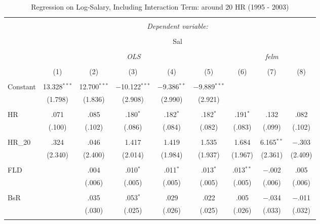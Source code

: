 
\begin{table}[H] \centering
  \caption{Regression on Log-Salary, Including Interaction Term: around 20 HR (1995 - 2003)} 
  \label{HR20_C}
\tiny
\begin{tabular}{@{\extracolsep{5pt}}lcccccccc}
\\[-1.8ex]\hline
\hline \\[-1.8ex]
 & \multicolumn{8}{c}{\textit{Dependent variable:}} \\
\cline{2-9}
\\[-1.8ex] & \multicolumn{8}{c}{Sal} \\
\\[-1.8ex] & \multicolumn{5}{c}{\textit{OLS}} & \multicolumn{3}{c}{\textit{felm}} \\
\\[-1.8ex] & (1) & (2) & (3) & (4) & (5) & (6) & (7) & (8)\\
\hline \\[-1.8ex]
 Constant & 13.328$^{***}$ & 12.700$^{***}$ & $-$10.122$^{***}$ & $-$9.386$^{**}$ & $-$9.889$^{***}$ &  &  &  \\
  & (1.798) & (1.836) & (2.908) & (2.990) & (2.921) &  &  &  \\
  & & & & & & & & \\
 HR & .071 & .085 & .180$^{*}$ & .182$^{*}$ & .182$^{*}$ & .191$^{*}$ & .132 & .082 \\
  & (.100) & (.102) & (.086) & (.084) & (.082) & (.083) & (.099) & (.102) \\
  & & & & & & & & \\
 HR\_20 & .324 & .046 & 1.417 & 1.419 & 1.535 & 1.684 & 6.165$^{**}$ & $-$.303 \\
  & (2.340) & (2.400) & (2.014) & (1.984) & (1.937) & (1.967) & (2.361) & (2.409) \\
  & & & & & & & & \\
 FLD &  & .004 & .010$^{*}$ & .011$^{*}$ & .013$^{*}$ & .013$^{**}$ & $-$.002 & .005 \\
  &  & (.006) & (.005) & (.005) & (.005) & (.005) & (.006) & (.006) \\
  & & & & & & & & \\
 BsR &  & .035 & .053$^{*}$ & .029 & .022 & .005 & $-$.034 & $-$.011 \\
  &  & (.030) & (.025) & (.026) & (.025) & (.026) & (.033) & (.032) \\
  & & & & & & & & \\

\end{tabular}
\end{table}
